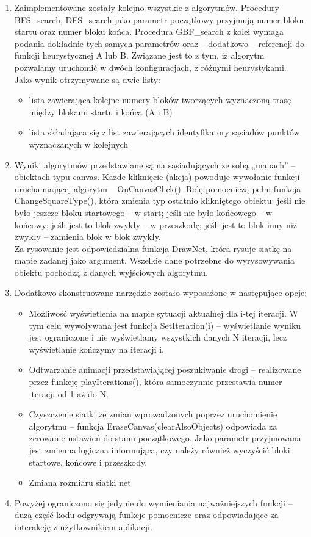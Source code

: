 \documentclass{article}
\begin{document}
\begin{enumerate}
	\newpage
	\item Zaimplementowane zostały kolejno wszystkie z algorytmów.
Procedury BFS{\_}search,  DFS{\_}search jako parametr początkowy przyjmują numer bloku startu oraz numer bloku końca. Procedura GBF{\_}search z kolei wymaga podania dokładnie tych samych parametrów oraz – dodatkowo – referencji do funkcji heurystycznej A lub B. Związane jest to z tym, iż algorytm pozwalamy uruchomić w dwóch konfiguracjach, z różnymi heurystykami. \\
Jako wynik otrzymywane są dwie listy:
	\begin{itemize}
		\item lista zawierająca kolejne numery bloków tworzących wyznaczoną trasę między blokami startu i końca (A i B)
		\item lista składająca się z list zawierających identyfikatory sąsiadów punktów wyznaczanych w kolejnych 
	\end{itemize}
	\item Wyniki algorytmów przedstawiane są na sąsiadujących ze sobą „mapach” – obiektach typu canvas. Każde kliknięcie (akcja) powoduje wywołanie funkcji uruchamiającej algorytm – OnCanvasClick(). Rolę pomocniczą pełni funkcja ChangeSquareType(), która zmienia typ ostatnio klikniętego obiektu: jeśli nie było jeszcze bloku startowego – w start; jeśli nie było końcowego – w końcowy; jeśli jest to blok zwykły – w przeszkodę; jeśli jest to blok inny niż zwykły – zamienia blok w blok zwykły. \\
Za rysowanie jest odpowiedzialna funkcja DrawNet, która rysuje siatkę na mapie zadanej jako argument. Wszelkie dane potrzebne do wyrysowywania obiektu pochodzą z danych wyjściowych algorytmu. 
	\item Dodatkowo skonstruowane narzędzie zostało wyposażone w następujące opcje:
	\begin{itemize}
			\item Możliwość wyświetlenia na mapie sytuacji aktualnej dla i-tej iteracji. W tym celu wywoływana jest funkcja SetIteration(i) – wyświetlanie wyniku jest ograniczone i nie wyświetlamy wszystkich danych N iteracji, lecz wyświetlanie kończymy na iteracji i.
   			\item Odtwarzanie animacji przedstawiającej poszukiwanie drogi – realizowane przez funkcję playIterations(), która samoczynnie przestawia numer iteracji od 1 aż do N.
			\item Czyszczenie siatki ze zmian wprowadzonych poprzez uruchomienie algorytmu – funkcja EraseCanvas(clearAlsoObjects) odpowiada za zerowanie ustawień do stanu początkowego. Jako parametr przyjmowana jest zmienna logiczna informująca, czy należy również wyczyścić bloki startowe, końcowe i przeszkody. 
			\item Zmiana rozmiaru siatki net
	\end{itemize}
	\item Powyżej ograniczono się jedynie do wymieniania najważniejszych funkcji – dużą część kodu odgrywają funkcje pomocnicze oraz odpowiadające za interakcję z użytkownikiem aplikacji. 
\end{enumerate}
\end{document}
